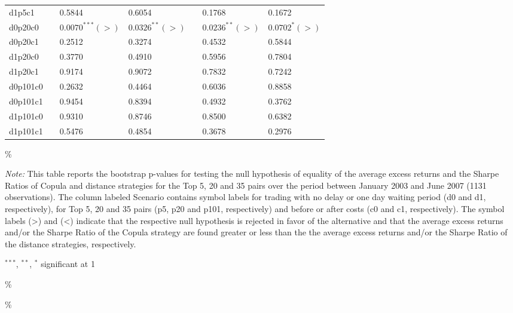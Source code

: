 \documentclass[a4paper]{article}
\begin{document}
\begin{threeparttable}[H]
\begin{tabularx}{\textwidth}{@{\extracolsep{\fill}}lllllll@{}}
		d1p5c1 & & 0.5844 & 0.6054 &       & 0.1768 & 0.1672 \\
		d0p20c0 & & $0.0070^{***}(>)$ & $0.0326^{**}(>)$ &       & $0.0236^{**}(>)$ & $0.0702^{*}(>)$ \\
		d0p20c1 & & 0.2512 & 0.3274 &       & 0.4532 & 0.5844 \\
		d1p20c0 & & 0.3770 & 0.4910 &       & 0.5956 & 0.7804 \\
		d1p20c1 & & 0.9174 & 0.9072 &       & 0.7832 & 0.7242 \\
		d0p101c0 & & 0.2632 & 0.4464 &       & 0.6036 & 0.8858 \\
		d0p101c1 & & 0.9454 & 0.8394 &       & 0.4932 & 0.3762 \\
		d1p101c0 & & 0.9310 & 0.8746 &       & 0.8500 & 0.6382 \\
		d1p101c1 & & 0.5476 & 0.4854 &       & 0.3678 & 0.2976 \\
		\bottomrule
	\end{tabularx}\%
	\begin{tablenotes}
		\item \textit{Note:} \scriptsize This table reports the bootstrap p-values for testing the null hypothesis of equality of the average excess returns and the Sharpe Ratios of Copula and distance strategies for the Top 5, 20 and 35 pairs over the period between January 2003 and June 2007 (1131 observations). The column labeled Scenario contains symbol labels for trading with no delay or one day waiting period (d0 and d1, respectively), for Top 5, 20 and 35 pairs (p5, p20 and p101, respectively) and before or after costs (c0 and c1, respectively). The symbol labels (>) and (<) indicate that the respective null hypothesis is rejected in favor of the alternative and that the average excess returns and/or the Sharpe Ratio of the Copula strategy are found greater or less than the the average excess returns and/or the Sharpe Ratio of the distance strategies, respectively.
		\item \scriptsize $^{\ast\ast\ast}$, $^{\ast\ast}$, $^{\ast}$  significant at 1\\%
	\end{tablenotes}
	\label{tab:table123}\%
\end{threeparttable}\%

\medskip
\end{document}
